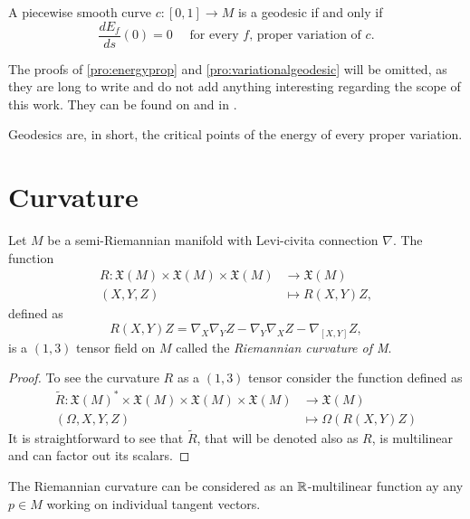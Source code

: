 \begin{proposition}
	\label{pro:variationalgeodesic}
	A piecewise smooth curve $c \colon [0,1] \to M$ is a geodesic if and only if
	\[
		\frac{dE_f}{ds}(0) = 0 \quad \textrm{ for every $f$, proper variation of $c$}.
	\]
\end{proposition}

The proofs of \autoref{pro:energyprop} and \autoref{pro:variationalgeodesic} will be omitted, as they are long to write and do not add anything interesting regarding the scope of this work. They can be found on \cite[Ch. 9, Prop. 2.4]{docarmo79} and in \cite[Ch. 9, Prop. 2.5]{docarmo79}.

Geodesics are, in short, the critical points of the energy of every proper variation.

\section{Curvature}

\begin{lemma}
	Let $M$ be a semi-Riemannian manifold with Levi-civita connection $\nabla$. The function
	\begin{align*}
		R \colon \mathfrak{X}(M) \times \mathfrak{X}(M) \times \mathfrak{X}(M) &\to \mathfrak{X}(M) \\
		(X, Y, Z) &\mapsto R(X,Y)Z,
	\end{align*}
	defined as
	\[
		R(X,Y)Z = \nabla_X \nabla_Y Z - \nabla_Y \nabla_X Z - \nabla_{[X,Y]} Z,
	\]
	is a $(1,3)$ tensor field on $M$ called the \emph{Riemannian curvature of M}.
\end{lemma}

\begin{proof}
	To see the curvature $R$ as a $(1,3)$ tensor consider the function defined as
		\begin{align*}
		\tilde{R} \colon \mathfrak{X}(M)^* \times \mathfrak{X}(M) \times \mathfrak{X}(M) \times \mathfrak{X}(M) &\to \mathfrak{X}(M) \\
		(\Omega, X, Y, Z) &\mapsto \Omega\left(R(X,Y)Z\right)
	\end{align*}
	It is straightforward to see that $\tilde{R}$, that will be denoted also as $R$, is multilinear and can factor out its scalars.
\end{proof}

The Riemannian curvature can be considered as an $\mathbb{R}$-multilinear function ay any $p\in M$ working on individual tangent vectors.

